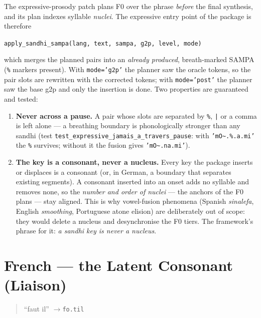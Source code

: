 \documentclass[11pt,a4paper]{report}
\newcommand{\smp}[1]{\texttt{#1}}          %
\newcommand{\tld}{\textasciitilde{}}      %
\begin{document}
The expressive-prosody patch plans F0 over the phrase \emph{before} the
final synthesis, and its plan indexes syllable \emph{nuclei}. The expressive
entry point of the package is therefore
\begin{center}
\smp{apply\_sandhi\_sampa(lang, text, sampa, g2p, level, mode)}
\end{center}
which merges the planned pairs into an \emph{already produced}, breath-marked
SAMPA (\smp{\%} markers present). With \smp{mode='g2p'} the planner saw the
oracle tokens, so the pair slots are rewritten with the corrected tokens;
with \smp{mode='post'} the planner saw the base g2p and only the insertion is
done. Two properties are guaranteed and tested:

\begin{enumerate}
  \item \textbf{Never across a pause.} A pair whose slots are separated by
        \smp{\%}, \smp{|} or a comma is left alone — a breathing boundary is
        phonologically stronger than any sandhi (test
        \smp{test\_expressive\_jamais\_a\_travers\_pause}: with
        \smp{'mO\tld.\%.a.mi'} the \smp{\%} survives; without it the fusion
        gives \smp{'mO\tld.na.mi'}).
  \item \textbf{The key is a consonant, never a nucleus.} Every key the
        package inserts or displaces is a consonant (or, in German, a
        boundary that separates existing segments). A consonant inserted
        into an onset adds no syllable and removes none, so the \emph{number
        and order of nuclei} — the anchors of the F0 plans — stay aligned.
        This is why vowel-fusion phenomena (Spanish \emph{sinalefa}, English
        \emph{smoothing}, Portuguese atone elision) are deliberately out of
        scope: they would delete a nucleus and desynchronise the F0 tiers.
        The framework's phrase for it: \emph{a sandhi key is never a
        nucleus}.
\end{enumerate}

\chapter{French — the Latent Consonant (Liaison)}
\label{chap:fr}

\begin{quote}\large
``faut il'' \quad$\rightarrow$\quad \smp{fo.til}
\end{quote}
\end{document}
